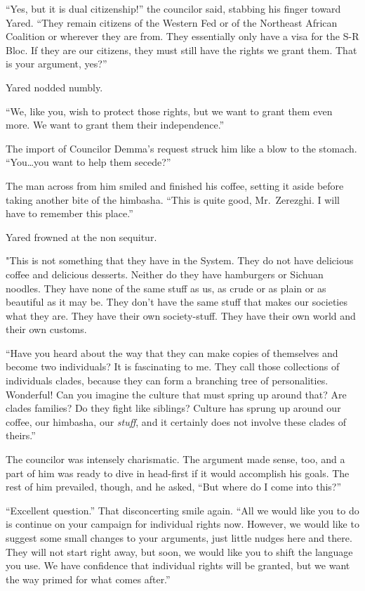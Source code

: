 ``Yes, but it is dual citizenship!'' the councilor said, stabbing his finger toward Yared. ``They remain citizens of the Western Fed or of the Northeast African Coalition or wherever they are from. They essentially only have a visa for the S-R Bloc. If they are our citizens, they must still have the rights we grant them. That is your argument, yes?''

Yared nodded numbly.

``We, like you, wish to protect those rights, but we want to grant them even more. We want to grant them their independence.''

The import of Councilor Demma's request struck him like a blow to the stomach. ``You\ldots you want to help them secede?''

The man across from him smiled and finished his coffee, setting it aside before taking another bite of the himbasha. ``This is quite good, Mr.~Zerezghi. I will have to remember this place.''

Yared frowned at the non sequitur.

"This is not something that they have in the System. They do not have delicious coffee and delicious desserts. Neither do they have hamburgers or Sichuan noodles. They have none of the same stuff as us, as crude or as plain or as beautiful as it may be. They don't have the same stuff that makes our societies what they are. They have their own society-stuff. They have their own world and their own customs.

``Have you heard about the way that they can make copies of themselves and become two individuals? It is fascinating to me. They call those collections of individuals clades, because they can form a branching tree of personalities. Wonderful! Can you imagine the culture that must spring up around that? Are clades families? Do they fight like siblings? Culture has sprung up around our coffee, our himbasha, our \emph{stuff}, and it certainly does not involve these clades of theirs.''

The councilor was intensely charismatic. The argument made sense, too, and a part of him was ready to dive in head-first if it would accomplish his goals. The rest of him prevailed, though, and he asked, ``But where do I come into this?''

``Excellent question.'' That disconcerting smile again. ``All we would like you to do is continue on your campaign for individual rights now. However, we would like to suggest some small changes to your arguments, just little nudges here and there. They will not start right away, but soon, we would like you to shift the language you use. We have confidence that individual rights will be granted, but we want the way primed for what comes after.''

